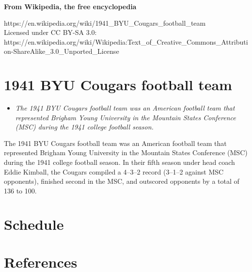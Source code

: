 \textbf{From Wikipedia, the free encyclopedia}

https://en.wikipedia.org/wiki/1941\_BYU\_Cougars\_football\_team\\
Licensed under CC BY-SA 3.0:\\
https://en.wikipedia.org/wiki/Wikipedia:Text\_of\_Creative\_Commons\_Attribution-ShareAlike\_3.0\_Unported\_License

\section{1941 BYU Cougars football
team}\label{byu-cougars-football-team}

\begin{itemize}
\item
  \emph{The 1941 BYU Cougars football team was an American football team
  that represented Brigham Young University in the Mountain States
  Conference (MSC) during the 1941 college football season.}
\end{itemize}

The 1941 BYU Cougars football team was an American football team that
represented Brigham Young University in the Mountain States Conference
(MSC) during the 1941 college football season. In their fifth season
under head coach Eddie Kimball, the Cougars compiled a 4--3--2 record
(3--1--2 against MSC opponents), finished second in the MSC, and
outscored opponents by a total of 136 to 100.

\section{Schedule}\label{schedule}

\section{References}\label{references}
